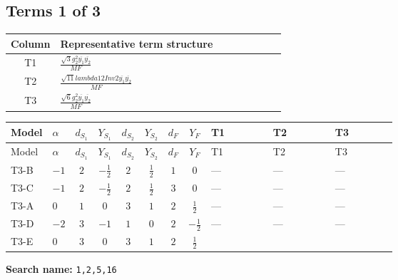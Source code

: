 \documentclass[8pt]{article}
\begin{document}
\begin{landscape}
\subsection*{Terms 1 of 3}
\begin{center}
\begin{tabular}{@{}c >{\raggedright\arraybackslash}p{0.82\linewidth}@{}}
\toprule
Column & Representative term structure \\
\midrule
T1 & \(\displaystyle \frac{\sqrt{3} g_{2}^{2} \overline{y_{1}} \overline{y_{2}}}{MF}\) \\
\midrule
T2 & \(\displaystyle \frac{\sqrt{11} lambda12Inv2 \overline{y_{1}} \overline{y_{2}}}{MF}\) \\
\midrule
T3 & \(\displaystyle \frac{\sqrt{6} g_{2}^{2} \overline{y_{1}} \overline{y_{2}}}{MF}\) \\
\midrule
\bottomrule
\end{tabular}
\end{center}
\smallskip
\tiny
\begin{longtable}{@{}llcccccc >{\raggedright\arraybackslash}p{0.21\linewidth} >{\raggedright\arraybackslash}p{0.21\linewidth} >{\raggedright\arraybackslash}p{0.21\linewidth}@{}}
\toprule
Model & $\alpha$ & $d_{S_1}$ & $Y_{S_1}$ & $d_{S_2}$ & $Y_{S_2}$ & $d_F$ & $Y_F$ & T1 & T2 & T3 \\
\midrule
\endfirsthead
\toprule
Model & $\alpha$ & $d_{S_1}$ & $Y_{S_1}$ & $d_{S_2}$ & $Y_{S_2}$ & $d_F$ & $Y_F$ & T1 & T2 & T3 \\
\midrule
\endhead
T3-B & $-1$ & $2$ & $-\frac{1}{2}$ & $2$ & $\frac{1}{2}$ & $1$ & $0$ & --- & --- & --- \\
\midrule
T3-C & $-1$ & $2$ & $-\frac{1}{2}$ & $2$ & $\frac{1}{2}$ & $3$ & $0$ & --- & --- & --- \\
\midrule
T3-A & $0$ & $1$ & $0$ & $3$ & $1$ & $2$ & $\frac{1}{2}$ & --- & --- & --- \\
\midrule
T3-D & $-2$ & $3$ & $-1$ & $1$ & $0$ & $2$ & $-\frac{1}{2}$ & --- & --- & --- \\
\midrule
T3-E & $0$ & $3$ & $0$ & $3$ & $1$ & $2$ & $\frac{1}{2}$ & \scriptsize\adjustbox{max width=\linewidth}{$\begin{gathered} - \frac{15 \sqrt{3} g_{2}^{2} \overline{y_{1}} \overline{y_{2}}}{8 MF}\end{gathered}$} & \scriptsize\adjustbox{max width=\linewidth}{$\begin{gathered} - \frac{3 \sqrt{11} lambda12Inv2 \overline{y_{1}} \overline{y_{2}}}{22 MF}\end{gathered}$} & \scriptsize\adjustbox{max width=\linewidth}{$\begin{gathered} - \frac{\sqrt{6} g_{2}^{2} \overline{y_{1}} \overline{y_{2}}}{6 MF}\end{gathered}$} \\
\midrule
\bottomrule
\end{longtable}
\clearpage
\noindent\textbf{Search name: }\texttt{1,2,5,16}\par\smallskip

\end{landscape}
\end{document}
